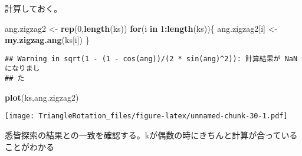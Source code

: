 \documentclass[]{article}
\newenvironment{Shaded}{\begin{snugshade}}{\end{snugshade}}
\newcommand{\KeywordTok}[1]{\textcolor[rgb]{0.13,0.29,0.53}{\textbf{#1}}}
\newcommand{\DataTypeTok}[1]{\textcolor[rgb]{0.13,0.29,0.53}{#1}}
\newcommand{\DecValTok}[1]{\textcolor[rgb]{0.00,0.00,0.81}{#1}}
\newcommand{\StringTok}[1]{\textcolor[rgb]{0.31,0.60,0.02}{#1}}
\newcommand{\ControlFlowTok}[1]{\textcolor[rgb]{0.13,0.29,0.53}{\textbf{#1}}}
\newcommand{\OperatorTok}[1]{\textcolor[rgb]{0.81,0.36,0.00}{\textbf{#1}}}
\newcommand{\NormalTok}[1]{#1}
\begin{document}
計算しておく。

\begin{Shaded}
\begin{Highlighting}[]
\NormalTok{ang.zigzag2 <-}\StringTok{ }\KeywordTok{rep}\NormalTok{(}\DecValTok{0}\NormalTok{,}\KeywordTok{length}\NormalTok{(ks))}
\ControlFlowTok{for}\NormalTok{(i }\ControlFlowTok{in} \DecValTok{1}\OperatorTok{:}\KeywordTok{length}\NormalTok{(ks))\{}
\NormalTok{  ang.zigzag2[i] <-}\StringTok{ }\KeywordTok{my.zigzag.ang}\NormalTok{(ks[i])}
\NormalTok{\}}
\end{Highlighting}
\end{Shaded}

\begin{verbatim}
## Warning in sqrt(1 - (1 - cos(ang))/(2 * sin(ang)^2)): 計算結果が NaN になりまし
## た
\end{verbatim}

\begin{Shaded}
\begin{Highlighting}[]
\KeywordTok{plot}\NormalTok{(ks,ang.zigzag2)}
\end{Highlighting}
\end{Shaded}

\texttt{[image: TriangleRotation\_files/figure-latex/unnamed-chunk-30-1.pdf]}

悉皆探索の結果との一致を確認する。kが偶数の時にきちんと計算が合っていることがわかる

\begin{Shaded}
\end{Shaded}
\end{document}
